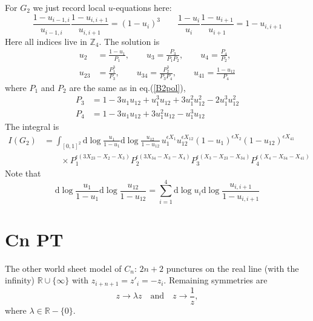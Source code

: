 \documentclass[12pt]{article}
\theoremstyle{definition}
\theoremstyle{plain}
\newcommand{\dif}{\mathrm{d}} %
\begin{document}
For $G_{2}$ we just record local $u$-equations here:
\begin{equation}
    \frac{1-u_{i-1,i}}{u_{i-1,i}}\frac{1-u_{i,i+1}}{u_{i,i+1}}= (1-u_{i})^{3} \qquad 
\frac{1-u_{i}}{u_{i}}\frac{1-u_{i+1}}{u_{i+1}} = 1-u_{i,i+1}
\end{equation}
Here all indices live in $\mathds{Z}_{4}$. The solution is
\begin{align}
   u_{2}&=\frac{1-u_{1}}{P_{1}},\qquad u_{3}=\frac{P_{3}}{P_{1}P_{2}},\qquad 
   u_{4}=\frac{P_{4}}{P_{2}} ,\nonumber \\ 
   u_{23}&=\frac{P_{1}^{3}}{P_{3}},\qquad  u_{34}=\frac{P_{2}^{3}}{P_{3}P_{4}}, \qquad u_{41}=\frac{1-u_{12}}{P_{4}} 
\end{align}
where $P_{1}$ and $P_{2}$ are the same as in eq.(\ref{B2pol}), 
\begin{align}
 P_{3}&=1-3u_{1}u_{12}+u_{1}^{3}u_{12}+3u_{1}^{2}u_{12}^{2}-2u_{1}^{3}u_{12}^{2} \nonumber \\
 P_{4}&=1-3u_{1}u_{12}+3u_{1}^{2}u_{12}-u_{1}^{3}u_{12}
\end{align}
The integral is
\begin{align*}
    I(G_{2})&=\int_{[0,1]^{2}}\dif\log\frac{u_{1}}{1-u_{1}}\dif\log\frac{u_{12}}{1-u_{12}}\,u_{1}^{\epsilon X_{1}} u_{12}^{\epsilon X_{12}}
    (1-u_{1})^{\epsilon X_{2}}(1-u_{12})^{\epsilon X_{41}} \nonumber\\
   &\qquad \times P_{1}^{\epsilon(3X_{23}-X_{2}-X_{3})}P_{2}^{\epsilon(3X_{34}-X_{3}-X_{4})}
   P_{3}^{\epsilon(X_{3}-X_{23}-X_{34})}P_{4}^{\epsilon(X_{4}-X_{34}-X_{41})}
\end{align*}
Note that
\begin{equation}
    \dif\log\frac{u_{1}}{1-u_{1}}\dif\log\frac{u_{12}}{1-u_{12}}
    =\sum_{i=1}^{4}\dif\log u_{i}\dif\log\frac{u_{i,i+1}}{1-u_{i,i+1}}
\end{equation}



\section{Cn PT}

The other world sheet model of $C_n$: $2n+2$ punctures on the real line (with the infinity) $\mathbb R\cup \{\infty\}$ with $z_{i+n+1}=z'_i=-z_i$. Remaining symmetries are 
\[
	z\to \lambda z\quad \text{and}\quad z\to \frac{1}{z},
\]
where $\lambda\in \mathbb R-\{0\}$.
\end{document}
